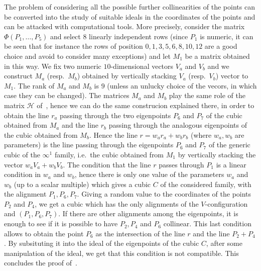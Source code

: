 \documentclass[11pt, a4paper, reqno, captions=tableheading,bibliography=totoc]{scrartcl}
\theoremstyle{plain}
\theoremstyle{definition}
\begin{document}
The problem of considering all the possible further
collinearities of the points can be converted into the study of suitable
ideals in the coordinates of the points and can be attacked with
computational tools. More precisely,
consider the matrix $\Phi(P_1, \dots, P_5)$ and select $8$ linearly independent
rows (since $P_1$ is numeric, it can be seen that for instance the rows
of position $0, 1, 3, 5, 6, 8, 10, 12$ are a good choice and avoid to consider
many exceptions) and let $M_1$ be a matrix obtained in this way.
We fix two numeric $10$-dimensional vectors $V_a$ and $V_b$ and we construct
$M_a$ (resp.\ $M_b$) obtained by vertically stacking $V_a$ (resp.\ $V_b$)
vector to $M_1$. The rank of $M_a$ and $M_b$ is $9$ (unless an unlucky choice
of the vecors, in which case they can be changed). The matrices $M_a$ and
$M_b$ play the same role of the matrix $\mathcal{H}$
of~, hence we can do the same construcion explained
there, in order to obtain the line $r_a$ passing through the two
eigenpoints $P_6$ and $P_7$ of the cubic obtained from $M_a$ and the
line $r_b$ passing through the analogous eigenpoints of the cubic
obtained from $M_b$.
Hence the line $r = w_ar_a+w_br_b$
(where $w_a, w_b$ are parameters) is the line passing through the eigenpoints
$P_6$ and $P_7$
of the generic cubic of the $\infty^1$ family, i.e.\ the cubic obtained
from $M_1$ by vertically stacking the vector $w_aV_a+w_bV_b$. The condition
that the line $r$ passes through $P_1$ is a linear condition in $w_a$ and
$w_b$, hence there is only one value of the parameters $w_a$ and $w_b$
(up to a scalar multiple) which gives a cubic $C$ of the considered family,
with the alignment $P_1, P_6, P_7$. Giving a random value to the coordinates
of the points $P_2$ and $P_4$, we get a cubic which has the only alignments
of the $V$-configuration and $(P_1, P_6, P_7)$. If there are other alignments
among the eigenpoints, it is enough to see if it is possible to have
$P_2, P_4$ and $P_6$ collinear. This last condition allows to obtain the point
$P_6$ as the intersection of the line $r$ and the line $P_2+P_4$. By subsituting
it into the ideal of the eigenpoints of the cubic $C$, after some manipulation
of the ideal, we get that this condition is not compatible. This concludes
the proof of~.
\end{document}
